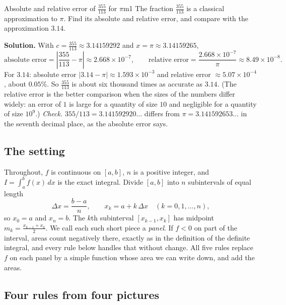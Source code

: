 \documentclass[11pt]{article}
\begin{document}
\begin{exmp}{Absolute and relative error of $\frac{355}{113}$ for $\pi$}{m1}
The fraction $\frac{355}{113}$ is a classical approximation to $\pi$. Find its absolute and relative error, and compare with the approximation $3.14$.

\textbf{Solution.} With $c=\frac{355}{113}\approx3.14159292$ and $x=\pi\approx3.14159265$,
\[\text{absolute error}=\left\lvert\frac{355}{113}-\pi\right\rvert\approx2.668\times10^{-7},\qquad\text{relative error}=\frac{2.668\times10^{-7}}{\pi}\approx8.49\times10^{-8}.\]
For $3.14$: absolute error $\lvert3.14-\pi\rvert\approx1.593\times10^{-3}$ and relative error $\approx5.07\times10^{-4}$, about $0.05\%$.
So $\frac{355}{113}$ is about six thousand times as accurate as $3.14$. (The relative error is the better comparison when the sizes of the numbers differ widely: an error of $1$ is large for a quantity of size $10$ and negligible for a quantity of size $10^9$.) \emph{Check.} $355/113=3.141592920\ldots$ differs from $\pi=3.141592653\ldots$ in the seventh decimal place, as the absolute error says.
\end{exmp}

\subsection*{The setting}

Throughout, $f$ is continuous on $[a,b]$, $n$ is a positive integer, and $I=\int_a^bf(x)\,dx$ is the exact integral. Divide $[a,b]$ into $n$ subintervals of equal length
\[\Delta x=\frac{b-a}n,\qquad x_k=a+k\,\Delta x\quad(k=0,1,\ldots,n),\]
so $x_0=a$ and $x_n=b$. The $k$th subinterval $[x_{k-1},x_k]$ has midpoint $m_k=\frac{x_{k-1}+x_k}2$. We call each such short piece a \emph{panel}. If $f<0$ on part of the interval, areas count negatively there, exactly as in the definition of the definite integral, and every rule below handles that without change. All five rules replace $f$ on each panel by a simple function whose area we can write down, and add the areas.

\subsection*{Four rules from four pictures}
\end{document}
